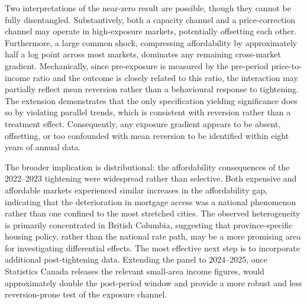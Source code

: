 \documentclass[12pt]{article}
\begin{document}
Two interpretations of the near-zero result are possible, though they cannot be fully disentangled. Substantively, both a capacity channel and a price-correction channel may operate in high-exposure markets, potentially offsetting each other. Furthermore, a large common shock, compressing affordability by approximately half a log point across most markets, dominates any remaining cross-market gradient. Mechanically, since pre-exposure is measured by the pre-period price-to-income ratio and the outcome is closely related to this ratio, the interaction may partially reflect mean reversion rather than a behavioural response to tightening. The extension demonstrates that the only specification yielding significance does so by violating parallel trends, which is consistent with reversion rather than a treatment effect. Consequently, any exposure gradient appears to be absent, offsetting, or too confounded with mean reversion to be identified within eight years of annual data.

The broader implication is distributional: the affordability consequences of the 2022–2023 tightening were widespread rather than selective. Both expensive and affordable markets experienced similar increases in the affordability gap, indicating that the deterioration in mortgage access was a national phenomenon rather than one confined to the most stretched cities. The observed heterogeneity is primarily concentrated in British Columbia, suggesting that province-specific housing policy, rather than the national rate path, may be a more promising area for investigating differential effects. The most effective next step is to incorporate additional post-tightening data. Extending the panel to 2024–2025, once Statistics Canada releases the relevant small-area income figures, would approximately double the post-period window and provide a more robust and less reversion-prone test of the exposure channel.
\end{document}
